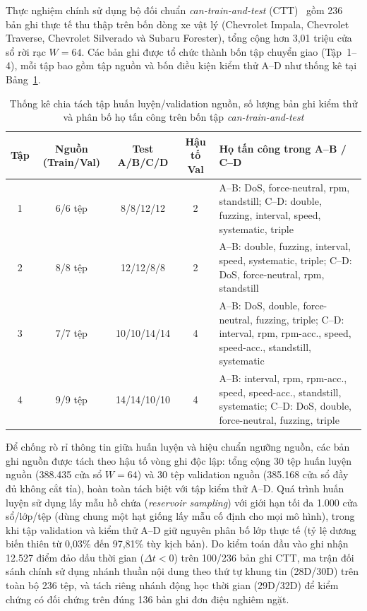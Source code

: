 \documentclass[12pt, a4paper, reqno, oneside]{book}
\begin{document}
Thực nghiệm chính sử dụng bộ đối chuẩn \textit{can-train-and-test} (CTT)~\cite{lampe2024curated}
gồm 236 bản ghi thực tế thu thập trên bốn dòng xe vật lý (Chevrolet Impala, Chevrolet Traverse, Chevrolet Silverado và Subaru Forester), tổng cộng hơn 3,01 triệu cửa sổ rời rạc $W=64$. Các bản ghi được tổ chức thành bốn tập chuyển giao (Tập~1--4), mỗi tập bao gồm tập nguồn và bốn điều kiện kiểm thử A--D như thống kê tại Bảng~\ref{tab:ctt-split}.

\begin{table}[htbp]
  \centering
  \caption[Thống kê chia tách dữ liệu và phân bố họ tấn công trên bốn tập CTT]{Thống kê chia tách tập huấn luyện/validation nguồn, số lượng bản ghi kiểm thử và phân bố họ tấn công trên bốn tập \textit{can-train-and-test}}
  \label{tab:ctt-split}
  \footnotesize
  \begin{tabular}{@{}c c c c p{6.4cm}@{}}
    \toprule
    \textbf{Tập} & \textbf{Nguồn (Train/Val)} & \textbf{Test A/B/C/D} & \textbf{Hậu tố Val} & \textbf{Họ tấn công trong A--B / C--D} \\
    \midrule
    1 & 6/6 tệp & 8/8/12/12 & 2 & A--B: DoS, force-neutral, rpm, standstill; C--D: double, fuzzing, interval, speed, systematic, triple \\
    2 & 8/8 tệp & 12/12/8/8 & 2 & A--B: double, fuzzing, interval, speed, systematic, triple; C--D: DoS, force-neutral, rpm, standstill \\
    3 & 7/7 tệp & 10/10/14/14 & 4 & A--B: DoS, double, force-neutral, fuzzing, triple; C--D: interval, rpm, rpm-acc., speed, speed-acc., standstill, systematic \\
    4 & 9/9 tệp & 14/14/10/10 & 4 & A--B: interval, rpm, rpm-acc., speed, speed-acc., standstill, systematic; C--D: DoS, double, force-neutral, fuzzing, triple \\
    \bottomrule
  \end{tabular}
\end{table}

Để chống rò rỉ thông tin giữa huấn luyện và hiệu chuẩn ngưỡng nguồn, các bản ghi nguồn được tách theo hậu tố vòng ghi độc lập: tổng cộng 30 tệp huấn luyện nguồn (388.435 cửa sổ $W=64$) và 30 tệp validation nguồn (385.168 cửa sổ đầy đủ không cắt tỉa), hoàn toàn tách biệt với tập kiểm thử A--D. Quá trình huấn luyện sử dụng lấy mẫu hồ chứa (\textit{reservoir sampling}) với giới hạn tối đa 1.000 cửa sổ/lớp/tệp (dùng chung một hạt giống lấy mẫu cố định cho mọi mô hình), trong khi tập validation và kiểm thử A--D giữ nguyên phân bố lớp thực tế (tỷ lệ dương biến thiên từ 0,03\% đến 97,81\% tùy kịch bản). Do kiểm toán đầu vào ghi nhận 12.527 điểm đảo dấu thời gian ($\Delta t < 0$) trên 100/236 bản ghi CTT, ma trận đối sánh chính sử dụng nhánh thuần nội dung theo thứ tự khung tin (28D/30D) trên toàn bộ 236 tệp, và tách riêng nhánh động học thời gian (29D/32D) để kiểm chứng có đối chứng trên đúng 136 bản ghi đơn điệu nghiêm ngặt.
\end{document}
